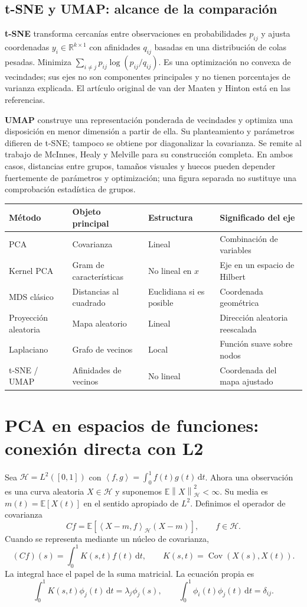\documentclass[11pt,a4paper]{article}
\newcommand{\R}{\mathbb R}
\newcommand{\E}{\mathbb E}
\newcommand{\dd}{\,\mathrm d}
\newcommand{\norm}[1]{\left\lVert #1\right\rVert}
\newcommand{\ip}[2]{\left\langle #1,#2\right\rangle}
\DeclareMathOperator{\Cov}{Cov}
\theoremstyle{definition}
\begin{document}
\subsection{t-SNE y UMAP: alcance de la comparación}
\textbf{t-SNE} transforma cercanías entre observaciones en probabilidades $p_{ij}$ y ajusta coordenadas $y_i\in\R^{k\times1}$ con afinidades $q_{ij}$ basadas en una distribución de colas pesadas. Minimiza $\sum_{i\ne j}p_{ij}\log(p_{ij}/q_{ij})$. Es una optimización no convexa de vecindades; sus ejes no son componentes principales y no tienen porcentajes de varianza explicada. El artículo original de van der Maaten y Hinton está en las referencias.

\textbf{UMAP} construye una representación ponderada de vecindades y optimiza una disposición en menor dimensión a partir de ella. Su planteamiento y parámetros difieren de t-SNE; tampoco se obtiene por diagonalizar la covarianza. Se remite al trabajo de McInnes, Healy y Melville para su construcción completa. En ambos casos, distancias entre grupos, tamaños visuales y huecos pueden depender fuertemente de parámetros y optimización; una figura separada no sustituye una comprobación estadística de grupos.
\begin{center}\small
\begin{tabular}{>{\raggedright\arraybackslash}p{2.8cm}>{\raggedright\arraybackslash}p{4.0cm}>{\raggedright\arraybackslash}p{3.5cm}>{\raggedright\arraybackslash}p{4.6cm}}\toprule
Método & Objeto principal & Estructura & Significado del eje\\\midrule
PCA & Covarianza & Lineal & Combinación de variables\\
Kernel PCA & Gram de características & No lineal en $x$ & Eje en un espacio de Hilbert\\
MDS clásico & Distancias al cuadrado & Euclidiana si es posible & Coordenada geométrica\\
Proyección aleatoria & Mapa aleatorio & Lineal & Dirección aleatoria reescalada\\
Laplaciano & Grafo de vecinos & Local & Función suave sobre nodos\\
t-SNE / UMAP & Afinidades de vecinos & No lineal & Coordenada del mapa ajustado\\\bottomrule
\end{tabular}\end{center}

\section{PCA en espacios de funciones: conexión directa con L2}
Sea $\mathcal H=L^2([0,1])$ con $\ip fg=\int_0^1f(t)g(t)\dd t$. Ahora una observación es una curva aleatoria $X\in\mathcal H$ y suponemos $\E\norm X_{\mathcal H}^2<\infty$. Su media es $m(t)=\E[X(t)]$ en el sentido apropiado de $L^2$. Definimos el operador de covarianza
\[
Cf=\E[\ip{X-m}f_{\mathcal H}(X-m)],\qquad f\in\mathcal H.
\]
Cuando se representa mediante un núcleo de covarianza,
\[
(Cf)(s)=\int_0^1K(s,t)f(t)\dd t,\qquad
K(s,t)=\Cov(X(s),X(t)).
\]
La integral hace el papel de la suma matricial. La ecuación propia es
\[
\boxed{\int_0^1K(s,t)\phi_j(t)\dd t=\lambda_j\phi_j(s)},\qquad
\int_0^1\phi_i(t)\phi_j(t)\dd t=\delta_{ij}.
\]
\end{document}
